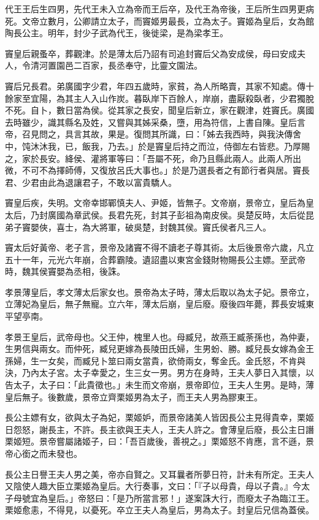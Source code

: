 \begin{pinyinscope}
代王王后生四男，先代王未入立為帝而王后卒，及代王為帝後，王后所生四男更病死。文帝立數月，公卿請立太子，而竇姬男最長，立為太子。竇姬為皇后，女為館陶長公主。明年，封少子武為代王，後徙梁，是為梁孝王。

竇皇后親蚤卒，葬觀津。於是薄太后乃詔有司追封竇后父為安成侯，母曰安成夫人，令清河置園邑二百家，長丞奉守，比靈文園法。

竇后兄長君。弟廣國字少君，年四五歲時，家貧，為人所略賣，其家不知處。傳十餘家至宜陽，為其主人入山作炭。暮臥岸下百餘人，岸崩，盡厭殺臥者，少君獨脫不死。自卜，數日當為侯。從其家之長安，聞皇后新立，家在觀津，姓竇氏。廣國去時雖少，識其縣名及姓，又嘗與其姊采桑，墮，用為符信，上書自陳。皇后言帝，召見問之，具言其故，果是。復問其所識，曰：「姊去我西時，與我決傳舍中，饨沐沐我，已，飯我，乃去。」於是竇皇后持之而泣，侍御左右皆悲。乃厚賜之，家於長安。絳侯、灌將軍等曰：「吾屬不死，命乃且縣此兩人。此兩人所出微，不可不為擇師傅，又復放呂氏大事也。」於是乃選長者之有節行者與居。竇長君、少君由此為退讓君子，不敢以富貴驕人。

竇皇后疾，失明。文帝幸邯鄲慎夫人、尹姬，皆無子。文帝崩，景帝立，皇后為皇太后，乃封廣國為章武侯。長君先死，封其子彭祖為南皮侯。吳楚反時，太后從昆弟子竇嬰俠，喜士，為大將軍，破吳楚，封魏其侯。竇氏侯者凡三人。

竇太后好黃帝、老子言，景帝及諸竇不得不讀老子尊其術。太后後景帝六歲，凡立五十一年，元光六年崩，合葬霸陵。遺詔盡以東宮金錢財物賜長公主嫖。至武帝時，魏其侯竇嬰為丞相，後誅。

孝景薄皇后，孝文薄太后家女也。景帝為太子時，薄太后取以為太子妃。景帝立，立薄妃為皇后，無子無寵。立六年，薄太后崩，皇后廢。廢後四年薨，葬長安城東平望亭南。

孝景王皇后，武帝母也。父王仲，槐里人也。母臧兒，故燕王臧荼孫也，為仲妻，生男信與兩女。而仲死，臧兒更嫁為長陵田氏婦，生男蚡、勝。臧兒長女嫁為金王孫婦，生一女矣，而臧兒卜筮曰兩女當貴，欲倚兩女，奪金氏。金氏怒，不肯與決，乃內太子宮。太子幸愛之，生三女一男。男方在身時，王夫人夢日入其懷，以告太子，太子曰：「此貴徵也。」未生而文帝崩，景帝即位，王夫人生男。是時，薄皇后無子。後數歲，景帝立齊栗姬男為太子，而王夫人男為膠東王。

長公主嫖有女，欲與太子為妃，栗姬妒，而景帝諸美人皆因長公主見得貴幸，栗姬日怨怒，謝長主，不許。長主欲與王夫人，王夫人許之。會薄皇后廢，長公主日譖栗姬短。景帝嘗屬諸姬子，曰：「吾百歲後，善視之。」栗姬怒不肯應，言不遜，景帝心銜之而未發也。

長公主日譽王夫人男之美，帝亦自賢之。又耳曩者所夢日符，計未有所定。王夫人又陰使人趣大臣立栗姬為皇后。大行奏事，文曰：「『子以母貴，母以子貴。』今太子母號宜為皇后。」帝怒曰：「是乃所當言邪！」遂案誅大行，而廢太子為臨江王。栗姬愈恚，不得見，以憂死。卒立王夫人為皇后，男為太子。封皇后兄信為蓋侯。


\end{pinyinscope}
